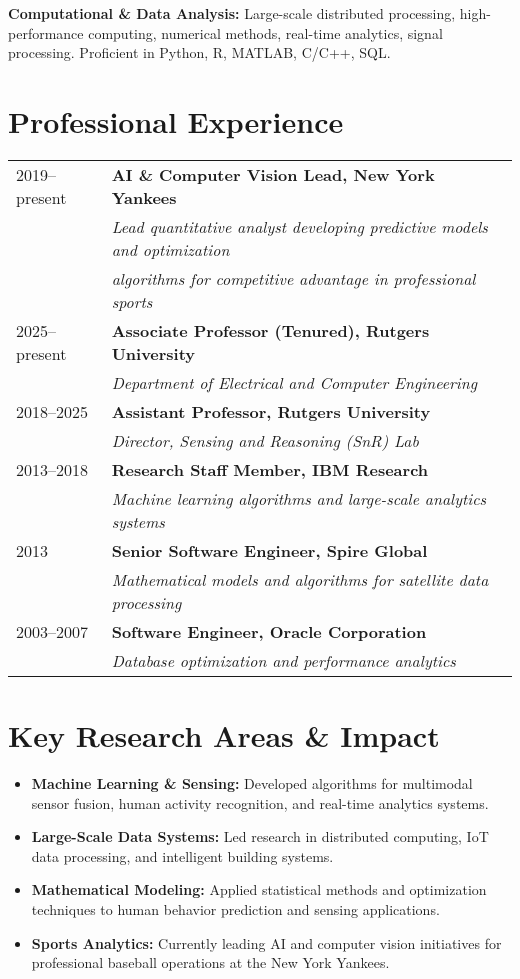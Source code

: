 \documentclass[11pt]{article}
\begin{document}
\textbf{Computational \& Data Analysis:} Large-scale distributed processing, high-performance computing, numerical methods, real-time analytics, signal processing. Proficient in Python, R, MATLAB, C/C++, SQL.

\section{Professional Experience}
\begin{tabular}{l l}
2019--present & \textbf{AI \& Computer Vision Lead, New York Yankees} \\
& \textit{Lead quantitative analyst developing predictive models and optimization} \\
& \textit{algorithms for competitive advantage in professional sports} \\
2025--present & \textbf{Associate Professor (Tenured), Rutgers University} \\
& \textit{Department of Electrical and Computer Engineering} \\
2018--2025 & \textbf{Assistant Professor, Rutgers University} \\
& \textit{Director, Sensing and Reasoning (SnR) Lab} \\
2013--2018 & \textbf{Research Staff Member, IBM Research} \\
& \textit{Machine learning algorithms and large-scale analytics systems} \\
2013 & \textbf{Senior Software Engineer, Spire Global} \\
& \textit{Mathematical models and algorithms for satellite data processing} \\
2003--2007 & \textbf{Software Engineer, Oracle Corporation} \\
& \textit{Database optimization and performance analytics} \\
\end{tabular}

\section{Key Research Areas \& Impact}
\begin{itemize}
    \item \textbf{Machine Learning \& Sensing:} Developed algorithms for multimodal sensor fusion, human activity recognition, and real-time analytics systems.
    \item \textbf{Large-Scale Data Systems:} Led research in distributed computing, IoT data processing, and intelligent building systems.
    \item \textbf{Mathematical Modeling:} Applied statistical methods and optimization techniques to human behavior prediction and sensing applications.
    \item \textbf{Sports Analytics:} Currently leading AI and computer vision initiatives for professional baseball operations at the New York Yankees.
\end{itemize}
\end{document}
